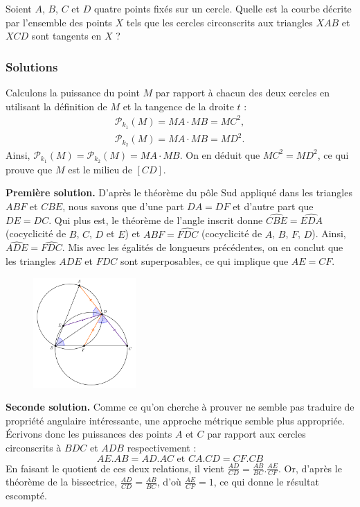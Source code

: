 \begin{exo}
Soient $A$, $B$, $C$ et $D$ quatre points fixés sur un cercle. Quelle est la courbe décrite par l'ensemble des points $X$ tels que les cercles circonscrits aux triangles $XAB$ et $XCD$ sont tangents en $X$ ?
\end{exo}


\subsubsection{Solutions}


\begin{sol}
Calculons la puissance du point $M$ par rapport à chacun des deux cercles en utilisant la définition de $M$ et la tangence de la droite $t$ :
\begin{gather*}
    \mathcal{P}_{k_1}(M) = MA \cdot MB = MC^2, \\
    \mathcal{P}_{k_2}(M) = MA \cdot MB = MD^2.
\end{gather*}
Ainsi, $\mathcal{P}_{k_1}(M) = \mathcal{P}_{k_2}(M) = MA \cdot MB$. On en déduit que $MC^2 = MD^2$, ce qui prouve que $M$ est le milieu de $[CD]$.
\end{sol}


\begin{sol}
\textbf{Première solution.} D'après le théorème du pôle Sud appliqué dans les triangles $ABF$ et $CBE$, nous savons que d'une part $DA=DF$ et d'autre part que $DE=DC$. Qui plus est, le théorème de l'angle inscrit donne $\widehat{CBE}=\widehat{EDA}$ (cocyclicité de $B$, $C$, $D$ et $E$) et $\widehat{ABF}=\widehat{FDC}$ (cocyclicité de $A$, $B$, $F$, $D$). Ainsi, $\widehat{ADE}=\widehat{FDC}$. Mis avec les égalités de longueurs précédentes, on en conclut que les triangles $ADE$ et $FDC$ sont superposables, ce qui implique que $AE=CF$.

\begin{figure}[!h]
\centerline{\includegraphics[width=0.35\textwidth]{pied_bissectrice}}
\end{figure}

\textbf{Seconde solution.} Comme ce qu'on cherche à prouver ne semble pas traduire de propriété angulaire intéressante, une approche métrique semble plus appropriée. Écrivons donc les puissances des points $A$ et $C$ par rapport aux cercles circonscrits à $BDC$ et $ADB$ respectivement :
\[ AE.AB = AD.AC \text{\ \ \ et\ \ \ } CA.CD = CF.CB \]
En faisant le quotient de ces deux relations, il vient $\frac{AD}{CD} = \frac{AB}{BC}.\frac{AE}{CF}$. Or, d'après le théorème de la bissectrice, $\frac{AD}{CD} = \frac{AB}{BC}$, d'où $\frac{AE}{CF}=1$, ce qui donne le résultat escompté.
\end{sol}


